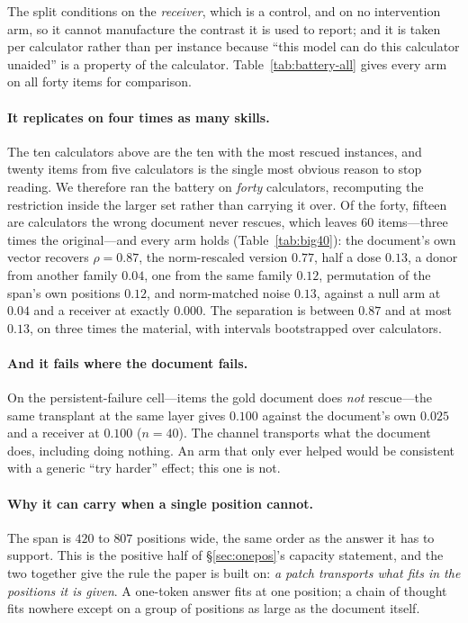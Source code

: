 \documentclass{article}
\begin{document}
The split conditions on the \emph{receiver}, which is a control, and on no
intervention arm, so it cannot manufacture the contrast it is used to report; and
it is taken per calculator rather than per instance because ``this model can do
this calculator unaided'' is a property of the calculator. Table~\ref{tab:battery-all}
gives every arm on all forty items for comparison.

\paragraph{It replicates on four times as many skills.} The ten calculators
above are the ten with the most rescued instances, and twenty items from five
calculators is the single most obvious reason to stop reading. We therefore ran
the battery on \emph{forty} calculators, recomputing the restriction inside the
larger set rather than carrying it over. Of the forty, fifteen are calculators
the wrong document never rescues, which leaves $60$ items---three times the
original---and every arm holds (Table~\ref{tab:big40}): the document's own
vector recovers $\rho = 0.87$, the norm-rescaled version $0.77$, half a dose
$0.13$, a donor from another family $0.04$, one from the same family $0.12$,
permutation of the span's own positions $0.12$, and norm-matched noise $0.13$,
against a null arm at $0.04$ and a receiver at exactly $0.000$. The separation
is between $0.87$ and at most $0.13$, on three times the material, with
intervals bootstrapped over calculators.



\paragraph{And it fails where the document fails.} On the persistent-failure
cell---items the gold document does \emph{not} rescue---the same transplant at
the same layer gives $0.100$ against the document's own $0.025$ and a receiver at
$0.100$ ($n=40$). The channel transports what the document does, including doing
nothing. An arm that only ever helped would be consistent with a generic ``try
harder'' effect; this one is not.

\paragraph{Why it can carry when a single position cannot.} The span is $420$ to
$807$ positions wide, the same order as the answer it has to support. This is the
positive half of \S\ref{sec:onepos}'s capacity statement, and the two together
give the rule the paper is built on: \emph{a patch transports what fits in the
positions it is given}. A one-token answer fits at one position; a chain of
thought fits nowhere except on a group of positions as large as the document
itself.
\end{document}
